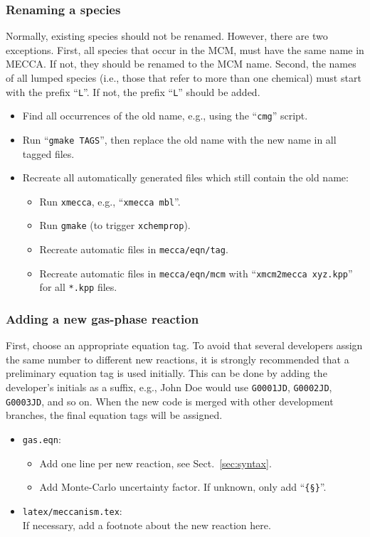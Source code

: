 \documentclass[a4paper,twoside]{article}
\newcommand{\I}[1]{\index{#1}}
\begin{document}
\subsubsection{Renaming a species}

Normally, existing species should not be renamed. However, there are two
exceptions. First, all species that occur in the MCM, must have the same
name in MECCA. If not, they should be renamed to the MCM name. Second,
the names of all lumped species (i.e., those that refer to more than one
chemical) must start with the prefix ``\verb|L|''. If not, the prefix
``\verb|L|'' should be added.

\begin{itemize}
\item Find all occurrences of the old name, e.g., using the
  ``\verb|cmg|'' script.
\item Run ``\verb|gmake TAGS|'', then replace the old name with the new
  name in all tagged files.
\item Recreate all automatically generated files which still contain the
  old name:
  \begin{itemize}
  \item Run \verb|xmecca|, e.g., ``\verb|xmecca mbl|''.
  \item Run \verb|gmake| (to trigger \verb|xchemprop|).
  \item Recreate automatic files in \verb|mecca/eqn/tag|.
  \item Recreate automatic files in \verb|mecca/eqn/mcm| with
  ``\verb|xmcm2mecca xyz.kpp|'' for all \verb|*.kpp| files.
  \end{itemize}
\end{itemize}

\subsubsection{Adding a new \I{gas phase}gas-phase reaction}
\label{sec:addgprxn}

First, choose an appropriate equation tag. To avoid that several
developers assign the same number to different new reactions, it is
strongly recommended that a preliminary equation tag is used initially.
This can be done by adding the developer's initials as a suffix, e.g.,
John Doe would use \verb|G0001JD|, \verb|G0002JD|, \verb|G0003JD|, and
so on. When the new code is merged with other development branches, the
final equation tags will be assigned.

\begin{itemize}
\item \I{equation file}\verb|gas.eqn|:
  \begin{itemize}
  \item Add one line per new reaction, see Sect.~\ref{sec:syntax}.
  \item Add Monte-Carlo uncertainty factor. If unknown, only add
    ``\I{$\mathsection$ (in {\tt *.eqn} file)}\verb|{§}|''.
  \end{itemize}
\item \verb|latex/meccanism.tex|:\\
  If necessary, add a footnote about the new reaction here.
\end{itemize}
\end{document}

